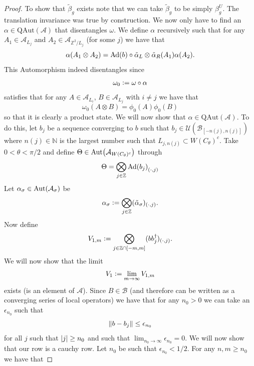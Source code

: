 \documentclass[12pt,a4paper,twoside]{article}
\newcommand{\defeq}{\vcentcolon=}
\let\originalleft\left
\let\originalright\right
\renewcommand{\left}{\mathopen{}\mathclose\bgroup\originalleft}
\renewcommand{\right}{\aftergroup\egroup\originalright}
\newcommand{\UU}{\mathcal U}
\newcommand{\BB}{\mathcal B}
\newcommand{\ZZ}{\mathbb Z}
\renewcommand{\AA}{\mathcal A}
\newcommand{\NN}{\mathbb{N}}
\newcommand{\Ad}[1]{\textrm{Ad}\left(#1\right)}
\newcommand{\Aut}[1]{\textrm{Aut}\left(#1\right)}
\theoremstyle{definition}
\numberwithin{equation}{section}
\begin{document}
\begin{proof}
	To show that $\tilde{\beta}_g$ exists note that we can take $\tilde{\beta}_g$ to be simply $\beta_g^{U}$. The translation invariance was true by construction. We now only have to find an $\alpha\in\textrm{QAut}(\AA)$ that disentangles $\omega$. We define $\alpha$ recursively such that for any $A_{1}\in\AA_{L_j}$ and $A_{2}\in\AA_{\ZZ^2/L_j}$ (for some $j$) we have that
	\begin{equation}
		\alpha(A_1\otimes A_2)=\Ad{b}\circ\tilde{\alpha}_L\otimes\tilde{\alpha}_R(A_1)\alpha(A_2).
	\end{equation}
	This Automorphism indeed disentangles since
	\begin{equation}
		\omega_0\defeq \omega\circ\alpha
	\end{equation}
	satisfies that for any $A\in\AA_{L_{i}}$, $B\in\AA_{L_{j}}$ with $i\neq j$ we have that
	\begin{equation}
		\omega_0(A\otimes B)=\phi_0(A)\phi_0(B)
	\end{equation}
	so that it is clearly a product state. We will now show that $\alpha\in\textrm{QAut}(\AA)$. To do this, let $b_j$ be a sequence converging to $b$ such that $b_j\in\UU(\BB_{[-n(j),n(j)]})$ where $n(j)\in\NN$ is the largest number such that $L_{j,n(j)}\subset W(C_\theta)^c$. Take $0<\theta<\pi/2$ and define $\Theta\in\Aut{\AA_{W(C_\theta)^c}}$ through
	\begin{equation}
		\Theta=\bigotimes_{j\in\ZZ}\Ad{b_j}_{(\cdot,j)}
	\end{equation}
	Let $\alpha_\sigma\in\Aut{\AA_\sigma}$ be
	\begin{equation}
		\alpha_\sigma\defeq \bigotimes_{j\in\ZZ}(\tilde\alpha_\sigma)_{(\cdot,j)}.
	\end{equation}
	Now define
	\begin{equation}
		V_{1,m}\defeq\bigotimes_{j\in\ZZ\cap[-m,m]}(bb_j^\dagger)_{(\cdot,j)}.
	\end{equation}
	We will now show that the limit
	\begin{equation}
		V_1\defeq\lim_{m\rightarrow\infty}V_{1,m}
	\end{equation}
	exists (is an element of $\AA$). Since $B\in\BB$ (and therefore can be written as a converging series of local operators) we have that for any $n_0>0$ we can take an $\epsilon_{n_0}$ such that
	\begin{equation}
		\norm{b-b_j}\leq\epsilon_{n_0}
	\end{equation}
	for all $j$ such that $\abs{j}\geq n_0$ and such that $\lim_{n_0\rightarrow\infty}\epsilon_{n_0}=0$. We will now show that our row is a cauchy row. Let $n_0$ be such that $\epsilon_{n_0}<1/2$. For any $n,m\geq n_0$ we have that

\end{proof}
\end{document}
